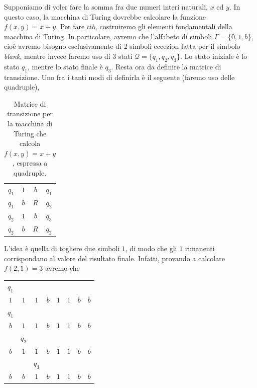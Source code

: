 \documentclass[10pt]{\classname}
\theoremstyle{definition}
\theoremstyle{definition}
\begin{document}
Supponiamo di voler fare la somma fra due numeri interi naturali, $x$ ed $y$.
In questo caso, la macchina di Turing dovrebbe calcolare la funzione $f(x,y) =
x + y$. Per fare ciò, costruiremo gli elementi fondamentali della macchina di
Turing. In particolare, avremo che l'alfabeto di simboli $\Gamma = \{0, 1,
b\}$, cioè avremo bisogno esclusivamente di $2$ simboli eccezion fatta per il
simbolo \emph{blank}, mentre invece faremo uso di $3$ stati $\mathcal Q =
\{q_1, q_2, q_3\}$. Lo stato iniziale è lo stato $q_1$, mentre lo stato finale
è $q_3$. Resta ora da definire la matrice di transizione. Uno fra i tanti modi
di definirla è il seguente (faremo uso delle quadruple),


\begin{table}[ht]
\centering
\begin{tabular}{cccc}
    $q_1$ & $1$ & $b$ & $q_1$\\
    $q_1$ & $b$ & $R$ & $q_2$\\
    $q_2$ & $1$ & $b$ & $q_3$\\
    $q_2$ & $b$ & $R$ & $q_2$

\end{tabular}
\caption{Matrice di transizione per la macchina di Turing che calcola $f(x,y) =
x + y$, espressa a quadruple.}\label{tab:mdtSomma}
\end{table}
\bigskip

L'idea è quella di togliere due simboli $1$, di modo che gli $1$ rimanenti
corrispondano al valore del risultato finale. Infatti, provando a calcolare
$f(2, 1) = 3$ avremo che

\begin{table}[ht]
\centering
\begin{tabular}{cccccccc}
   $q_1$&     &     &     &     &     &     &     \\
    $1$ & $1$ & $1$ & $b$ & $1$ & $1$ & $b$ & $b$ \\
   $q_1$&     &     &     &     &     &     &     \\
    $b$ & $1$ & $1$ & $b$ & $1$ & $1$ & $b$ & $b$ \\
        &$q_2$&     &     &     &     &     &     \\
    $b$ & $1$ & $1$ & $b$ & $1$ & $1$ & $b$ & $b$ \\
        &     &$q_3$&     &     &     &     &     \\
    $b$ & $b$ & $1$ & $b$ & $1$ & $1$ & $b$ & $b$
\end{tabular}
\end{table}
\bigskip
\end{document}
